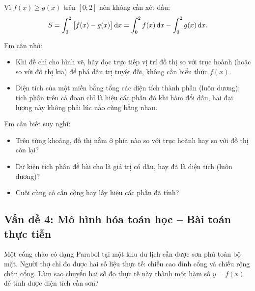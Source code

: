 \begin{loigiai}
Vì $f(x)\ge g(x)$ trên $[0;2]$ nên không cần xét dấu:
\[
S=\int_0^2\big[f(x)-g(x)\big]\,\mathrm{d}x = \int_0^2 f(x)\,\mathrm{d}x - \int_0^2 g(x)\,\mathrm{d}x.
\]
\end{loigiai}

\begin{hoptongket}
Em cần nhớ:
\begin{itemize}[leftmargin=1cm]
  \item Khi đề chỉ cho hình vẽ, hãy đọc trực tiếp vị trí đồ thị so với trục hoành (hoặc so với đồ thị kia) để phá dấu trị tuyệt đối, không cần biểu thức $f(x)$.
  \item Diện tích của một miền bằng tổng các diện tích thành phần (luôn dương); tích phân trên cả đoạn chỉ là hiệu các phần đó khi hàm đổi dấu, hai đại lượng này không phải lúc nào cũng bằng nhau.
\end{itemize}
Em cần biết suy nghĩ:
\begin{itemize}[leftmargin=1cm]
  \item Trên từng khoảng, đồ thị nằm ở phía nào so với trục hoành hay so với đồ thị còn lại?
  \item Dữ kiện tích phân đề bài cho là giá trị có dấu, hay đã là diện tích (luôn dương)?
  \item Cuối cùng có cần cộng hay lấy hiệu các phần đã tính?
\end{itemize}
\end{hoptongket}

\subsection{Vấn đề 4: Mô hình hóa toán học -- Bài toán thực tiễn}

\begin{hopkhampha}
Một cổng chào có dạng Parabol tại một khu du lịch cần được sơn phủ toàn bộ mặt. Người thợ chỉ đo được hai số liệu thực tế: chiều cao đỉnh cổng và chiều rộng chân cổng. Làm sao chuyển hai số đo thực tế này thành một hàm số $y=f(x)$ để tính được diện tích cần sơn?
\end{hopkhampha}

